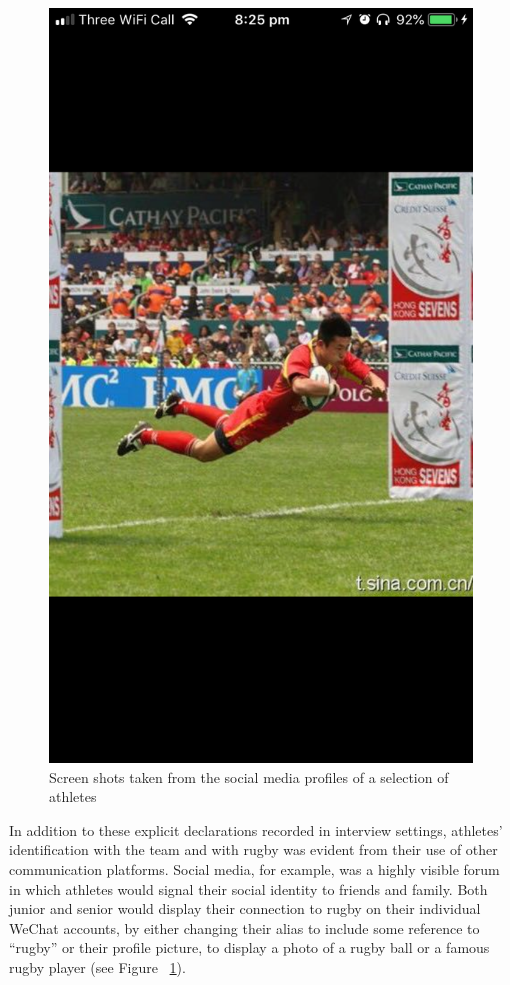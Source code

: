 \begin{CJK}{UTF8}{gbsn}
\begin{figure}[htbp]
\begin{center}
      \includegraphics[scale =.2]{images/bjmWeChatProfile4.png}
      \caption{Screen shots taken from the social media profiles of a selection of athletes}
    \end{center}
      \label{fig:bjmWeChatProfile}
  \end{figure}

In addition to these explicit declarations recorded in interview settings, athletes' identification with the team and with rugby was evident from their use of other communication platforms.  Social media, for example, was a highly visible forum in which athletes would signal their social identity to friends and family.  Both junior and senior would display their connection to rugby on their individual WeChat accounts, by either changing their alias to include some reference to ``rugby'' or their profile picture, to display a photo of a rugby ball or a famous rugby player (see Figure ~\ref{fig:bjmWeChatProfile}).


\end{CJK}
